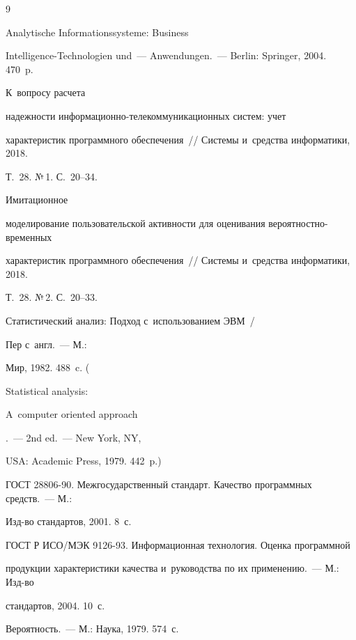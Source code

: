 {\small\frenchspacing


{%




\begin{thebibliography}{9}







 Analytische Informationssysteme: Business 


Intelligence-Technologien und~--- Anwendungen.~--- Berlin: Springer, 2004. 470~p.




 К~вопросу расчета 


надежности ин\-фор\-ма\-ци\-он\-но-те\-ле\-ком\-му\-ни\-ка\-ци\-он\-ных систем: учет 


характеристик программного обеспечения~/\!\!/ Системы и~средства информатики, 2018. 


Т.~28. №\,1. С.~20--34.







 Имитационное 


моделирование пользовательской активности для оценивания вероятностно-временных 


характеристик программного обеспечения~/\!\!/ Системы и~средства информатики, 2018. 


Т.~28. №\,2. С.~20--33.




 Статистический анализ: Подход с~использованием ЭВМ~/


Пер с~англ.~--- М.: 


Мир, 1982. 488~c. ( {Statistical analysis: 


A~computer oriented approach}.~--- 2nd ed.~--- New York, NY,


USA: Academic Press, 1979. 442~p.)




ГОСТ 28806-90. Межгосударственный стандарт. Качество программных средств.~--- М.: 


Изд-во стандартов, 2001. 8~с.




ГОСТ Р ИСО/МЭК 9126-93. Информационная технология. Оценка программной 


продукции характеристики качества и~руководства по их применению.~--- М.: Изд-во 


стандартов, 2004. 10~с.




 Вероятность.~--- М.: Наука, 1979. 574~с.





        \end{thebibliography}


} }

